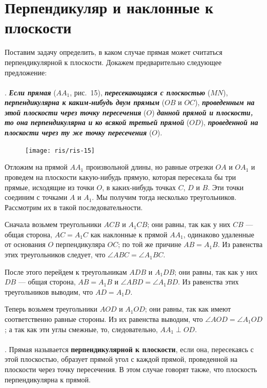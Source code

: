 \documentclass[twoside]{book}
\begin{document}
\section{Перпендикуляр и наклонные к плоскости}

Поставим задачу определить, в каком случае прямая может считаться перпендикулярной к плоскости.
Докажем предварительно следующее предложение:

\paragraph{}\label{1938/s23}
.
\textbf{\emph{Если прямая}} ($AA_1$, рис.~15), \textbf{\emph{пересекающаяся с плоскостью}} ($MN$), \textbf{\emph{перпендикулярна к каким-нибудь двум прямым}} ($OB$ и $OC$), \textbf{\emph{проведенным на этой плоскости через точку пересечения}} ($O$) \textbf{\emph{данной прямой и плоскости, то она перпендикулярна и ко всякой третьей прямой}} ($OD$), \textbf{\emph{проведенной на плоскости через ту же точку пересечения}} ($O$).

\begin{figure}[h!]
\centering
\texttt{[image: ris/ris-15]}
\caption{}
\end{figure}

Отложим на прямой $AA_1$ произвольной длины, но равные отрезки $OA$ и $OA_1$ и проведем на плоскости какую-нибудь прямую, которая пересекала бы три прямые, исходящие из точки $O$, в каких-нибудь точках $C$, $D$ и $B$.
Эти точки соединим с точками $A$ и $A_1$.
Мы получим тогда несколько треугольников.
Рассмотрим их в такой последовательности.

Сначала возьмем треугольники $ACB$ и $A_1CB$;
они равны, так как у них $CB$ --- общая сторона, $AC=A_1C$ как наклонные к прямой $AA_1$, одинаково удаленные от основания $O$ перпендикуляра $OC$;
по той же причине $AB=A_1B$.
Из равенства этих треугольников следует, что $\angle ABC=\angle A_1BC$.

После этого перейдем к треугольникам $ADB$ и $A_1DB$;
они равны, так как у них $DB$ --- общая сторона, $AB=A_1B$ и $\angle ABD=\angle A_1BD$.
Из равенства этих треугольников выводим, что $AD=A_1D$.

Теперь возьмем треугольники $AOD$ и $A_1OD$;
они равны, так как имеют соответственно равные стороны.
Из их равенства выводим, что $\angle AOD=\angle A_1OD$;
а так как эти углы смежные, то, следовательно, $AA_1\perp OD$.

\paragraph{}\label{1938/s24}
.
Прямая называется \textbf{перпендикулярной к плоскости}, если она, пересекаясь с этой плоскостью, образует прямой угол с каждой прямой, проведенной на плоскости через точку пересечения.
В этом случае говорят также, что плоскость перпендикулярна к прямой.
\end{document}
